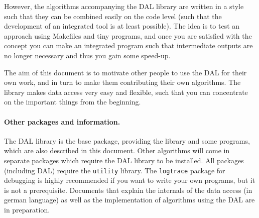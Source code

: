 \documentclass[a4paper]{book}
\begin{document}
However, the algorithms accompanying the DAL library are written in a
style such that they can be combined easily on the code level (such
that the development of an integrated tool is at least possible). The
idea is to test an approach using Makefiles and tiny programs,
and once you are satisfied with the concept you can make an integrated
program such that intermediate outputs are no longer necessary and
thus you gain some speed-up.

The aim of this document is to motivate other people to use the DAL
for their own work, and in turn to make them contributing their own
algorithms. The library makes data access very easy and flexible, such
that you can concentrate on the important things from the beginning.

\paragraph{Other packages and information.} 
The DAL library is the base package, providing the library and some
programs, which are also described in this document. Other algorithms
will come in separate packages which require the DAL library to be
installed. All packages (including DAL) require the {\tt utility}
library. The {\tt logtrace} package for debugging is highly recommended if
you want to write your own programs, but it is not a prerequisite.
Documents that explain the internals of the data access (in german
language) as well as the implementation of algorithms using the DAL
are in preparation.

\begin{comment}
\paragraph{Wishlist.}
Some things have not changed, for example, we still do not have a graphical
user interface. I think it is more important to have the functionality than a
GUI, but I also know that many people prefer clicking through windows. If
someone wants to spend some time on this, here is what I would like to see: A
graphical interface, which shows the flow of data from input files through
programs to output files and again into the next program etc. Changing and
extending the data flow should be done graphically. The visualizer should read
out and write back -- makefiles! And it would also be nice to have an
interactive data visualization, preferably in Java, mainly compatible to
gsv/xsv tools in the FC package.
\end{comment}
\end{document}
